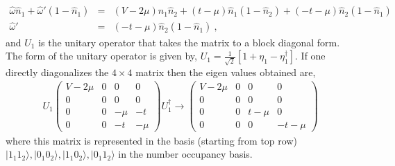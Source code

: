 \documentclass[12pt,a4paper]{article}
\begin{document}
\begin{eqnarray}
 \hat{\omega}\hat{n}_{1} + \hat{\omega}'(1-\hat{n}_{1}) &=& (V-2\mu)\hat{n}_{1}\hat{n}_{2} + (t-\mu)\hat{n}_{1}(1-\hat{n}_{2})+(-t-\mu)\hat{n}_{2}(1-\hat{n}_{1})\nonumber\\
 \hat{\omega}'&=& (-t-\mu)\hat{n}_{2}(1-\hat{n}_{1})~,
\end{eqnarray}
and $U_{1}$ is the unitary operator that takes the matrix to a block diagonal form.
The form of the unitary operator is given by, $U_{1} =\frac{1}{\sqrt{2}}[1+\eta_{1}-\eta^{\dagger}_{1}]$. If one directly diagonalizes the $4\times 4$ matrix then the eigen values obtained are,
\begin{eqnarray}
U_{1}\begin{pmatrix}
 V-2\mu & 0 & 0 &0\\
 0 & 0 &0 &0 \\
 0 & 0 & -\mu & -t\\
 0 & 0 & -t & -\mu 
\end{pmatrix}U_{1}^{\dagger}\rightarrow  \begin{pmatrix}
 V-2\mu & 0 & 0 &0\\
 0 & 0 &0 &0 \\
 0 & 0 & t-\mu & 0\\
 0 & 0 & 0 & -t-\mu 
\end{pmatrix}
\end{eqnarray}
where this matrix is represented in the basis (starting from top row) $|1_{1}1_{2}\rangle, |0_{1}0_{2}\rangle , |1_{1}0_{2}\rangle, |0_{1}1_{2}\rangle$ in the number occupancy basis.
\end{document}
